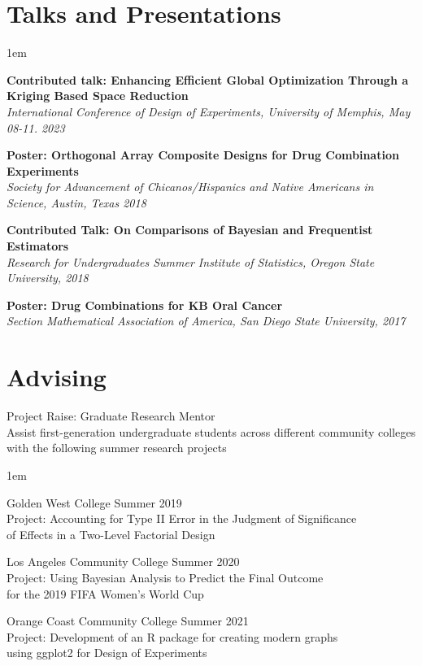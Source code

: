 \documentclass[margin,line]{res}
\newenvironment{list1}{
  \begin{list}{\ding{113}}{
      \setlength{\itemsep}{0in}
      \setlength{\parsep}{0in} \setlength{\parskip}{0in}
      \setlength{\topsep}{0in} \setlength{\partopsep}{0in} 
      \setlength{\leftmargin}{0.20in}}}{\end{list}}
\begin{document}
\begin{resume}
\section{\sc Talks and Presentations}
\begin{list1}
\itemsep1em
\item[] \textbf{Contributed talk: Enhancing Efficient Global Optimization Through a Kriging Based Space Reduction} \\
\textit{International Conference of Design of Experiments, University of Memphis, May 08-11. 2023}
\item[] \textbf{Poster: Orthogonal Array Composite Designs for Drug Combination Experiments}\\
\textit{Society for Advancement of Chicanos/Hispanics and Native Americans in Science, Austin, Texas 2018}
\newpage
\item[] \textbf{Contributed Talk: On Comparisons of Bayesian and Frequentist Estimators} \\
\textit{Research for Undergraduates Summer Institute of Statistics, Oregon State University, 2018}
\item[] \textbf{Poster: Drug Combinations for KB Oral Cancer}\\
\textit{Section Mathematical Association of America, San Diego State University, 2017}
\end{list1}





\section{\sc Advising}


{\sc Project Raise: Graduate Research Mentor}\\[5pt]
Assist first-generation undergraduate students across different community colleges with the
following summer research projects \\[4pt]
\begin{list1}
\itemsep1em
\item[] {\sc Golden West College} \hfill Summer 2019 \\[3pt]
Project: Accounting for Type II Error in the Judgment of Significance \\[3pt]
of Effects 
in a Two-Level Factorial Design
\item[] {\sc Los Angeles Community College} \hfill Summer 2020 \\[3pt]
Project: Using Bayesian Analysis to Predict the Final Outcome  \\[3pt]
for the 2019 
FIFA Women's World Cup
\item[] {\sc Orange Coast Community College} \hfill Summer 2021 \\[3pt]
Project: Development of an R package for creating modern graphs \\[3pt]
using ggplot2 for 
Design of Experiments
\end{list1}




\end{resume}
\end{document}

